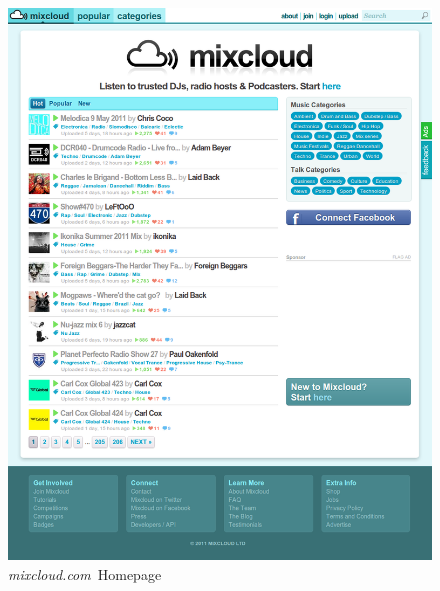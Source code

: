 \documentclass[a4paper,12pt,twoside,notitlepage]{report}
\def\mixurl{\emph{mixcloud.com}}
\begin{document}
\begin{figure}
 \centering
 \includegraphics[width=\textwidth]{./images/mixcloud-home.png}
 \caption{\mixurl\ Homepage}
 \label{fig:mix-home}
\end{figure}
\end{document}
